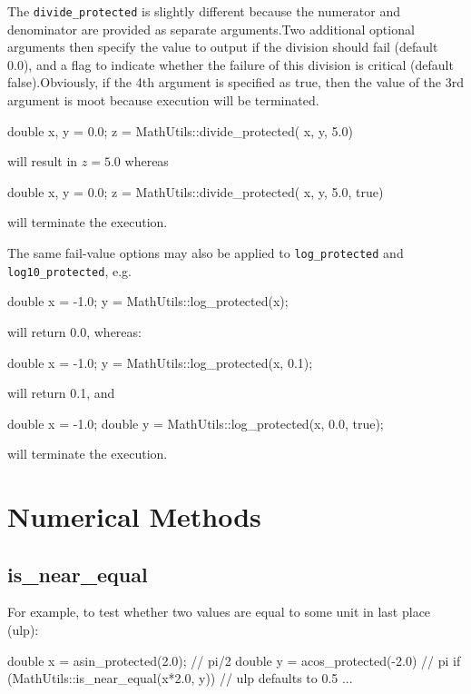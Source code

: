 \documentclass[11pt,fleqn]{report}
\begin{document}
The \texttt{divide\_protected} is slightly different because the numerator and
denominator are provided as separate arguments.Two additional optional
arguments then specify the value to output if the division should fail (default
0.0), and a flag to indicate whether the failure of this division is critical
(default false).Obviously, if the 4th argument is specified as true, then the
value of the 3rd argument is moot because execution will be terminated.
\begin{code}
double x, y = 0.0;
z = MathUtils::divide_protected( x, y, 5.0)
\end{code}
will result in $z = 5.0$ whereas
\begin{code}
double x, y = 0.0;
z = MathUtils::divide_protected( x, y, 5.0, true)
\end{code}
will terminate the execution.

The same fail-value options may also be applied to \texttt{log\_protected} and
\texttt{log10\_protected}, e.g.
\begin{code}
double x = -1.0;
y = MathUtils::log_protected(x);
\end{code}
will return 0.0, whereas:
\begin{code}
double x = -1.0;
y = MathUtils::log_protected(x, 0.1);
\end{code}
will return 0.1, and
\begin{code}
double x = -1.0;
double y = MathUtils::log_protected(x, 0.0, true);
\end{code}
will terminate the execution.

\section{Numerical Methods}

\subsection{is\_near\_equal}
For example, to test whether two values are equal to some unit
in last place (ulp):

\begin{code}
double x = asin_protected(2.0); // pi/2
double y = acos_protected(-2.0) // pi
if (MathUtils::is_near_equal(x*2.0, y)) { // ulp defaults to 0.5
...
}
\end{code}
\end{document}
